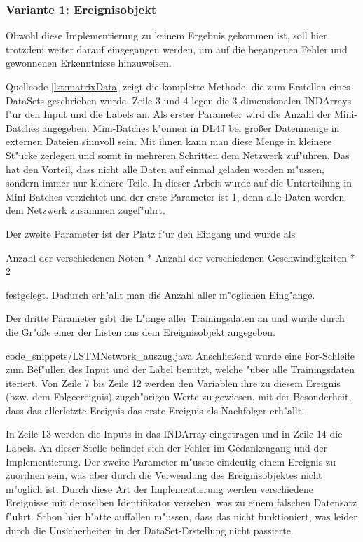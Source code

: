 {\subsubsection{Variante 1: Ereignisobjekt}
Obwohl diese Implementierung zu keinem Ergebnis gekommen ist, soll hier trotzdem weiter darauf eingegangen werden, um auf die begangenen Fehler und gewonnenen Erkenntnisse hinzuweisen.

Quellcode \ref{lst:matrixData} zeigt die komplette Methode, die zum Erstellen eines DataSets geschrieben wurde. Zeile 3 und 4 legen die 3-dimensionalen INDArrays f"ur den Input und die Labels an. Als erster Parameter wird die Anzahl der Mini-Batches angegeben. Mini-Batches k"onnen in DL4J bei gro{\ss}er Datenmenge in externen Dateien sinnvoll sein. Mit ihnen kann man diese Menge in kleinere St"ucke zerlegen und somit in mehreren Schritten dem Netzwerk zuf"uhren. Das hat den Vorteil, dass nicht alle Daten auf einmal geladen werden m"ussen, sondern immer nur kleinere Teile. In dieser Arbeit wurde auf die Unterteilung in Mini-Batches verzichtet und der erste Parameter ist 1, denn alle Daten werden dem Netzwerk zusammen zugef"uhrt.

Der zweite Parameter ist der Platz f"ur den Eingang und wurde als
\begin{center}{\glqq}Anzahl der verschiedenen Noten{\grqq} * {\glqq}Anzahl der verschiedenen Geschwindigkeiten{\grqq} * 2 \end{center}
festgelegt. Dadurch erh"allt man die Anzahl aller m"oglichen Eing"ange.

Der dritte Parameter gibt die L"ange aller Trainingsdaten an und wurde durch die Gr"o{\ss}e einer der Listen aus dem Ereignisobjekt angegeben.

{code_snippets/LSTMNetwork_auszug.java}
Anschlie{\ss}end wurde eine For-Schleife zum Bef"ullen des Input und der Label benutzt, welche "uber alle Trainingsdaten iteriert. Von Zeile 7 bis Zeile 12 werden den Variablen ihre zu diesem Ereignis (bzw. dem Folgeereignis) zugeh"origen Werte zu gewiesen, mit der Besonderheit, dass das allerletzte Ereignis das erste Ereignis als Nachfolger erh"allt.

In Zeile 13 werden die Inputs in das INDArray eingetragen und in Zeile 14 die Labels. An dieser Stelle befindet sich der Fehler im Gedankengang und der Implementierung. Der zweite Parameter m"usste eindeutig einem Ereignis zu zuordnen sein, was aber durch die Verwendung des Ereignisobjektes nicht m"oglich ist. Durch diese Art der Implementierung werden verschiedene Ereignisse mit demselben Identifikator versehen, was zu einem falschen Datensatz f"uhrt. Schon hier h"atte auffallen m"ussen, dass das nicht funktioniert, was leider durch die Unsicherheiten in der DataSet-Erstellung nicht passierte.

}

